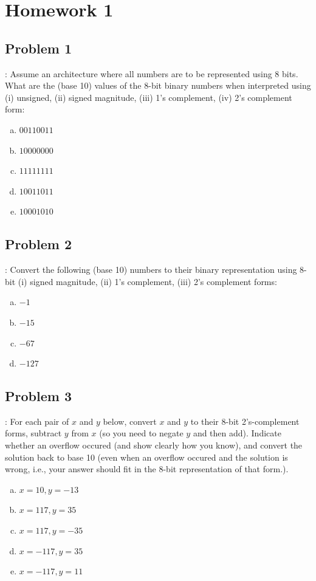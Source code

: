 \documentclass{../slides}
\begin{document}
\section{Homework 1}
\subsection{Problem 1}
\begin{frame}{\secname: \subsecname}
    Assume an architecture where all numbers are to be represented using 8 bits. What are the (base 10) values of the 8-bit binary numbers when interpreted using (i) unsigned, (ii) signed magnitude, (iii) 1’s complement, (iv) 2’s complement form:
    \begin{enumerate}[(a)]
        \item $00110011$
        \item $10000000$
        \item $11111111$
        \item $10011011$
        \item $10001010$
    \end{enumerate}
\end{frame}

\subsection{Problem 2}
\begin{frame}{\secname: \subsecname}
    Convert the following (base 10) numbers to their binary representation using 8-bit (i) signed magnitude, (ii) 1’s complement, (iii) 2’s complement forms:
    \begin{enumerate}[(a)]
        \item $-1$
        \item $-15$
        \item $-67$
        \item $-127$
    \end{enumerate}
\end{frame}

\subsection{Problem 3}
\begin{frame}{\secname: \subsecname}
    For each pair of $x$ and $y$ below, convert $x$ and $y$ to their 8-bit 2’s-complement forms, subtract $y$ from $x$ (so you need to negate $y$ and then add). Indicate whether an overflow occured (and show clearly how you know), and convert the solution back to base 10 (even when an overflow occured and the solution is wrong, i.e., your answer should fit in the 8-bit representation of that form.).
    \begin{enumerate}[(a)]
        \item $x = 10, y = -13$
        \item $x = 117, y = 35$
        \item $x = 117, y = -35$
        \item $x = -117, y = 35$
        \item $x = -117, y = 11$
    \end{enumerate}
\end{frame}
\end{document}
